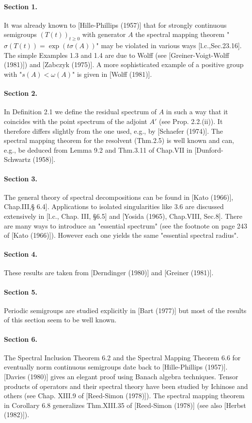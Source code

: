 \paragraph{Section 1.} It was already known to [Hille-Phillips (1957)] that for strongly continuous semigroups $(T(t))_{t\geq 0}$ with generator $A$ the spectral mapping theorem "$\sigma(T(t)) = \exp(t\sigma(A))$" may be violated in various ways [l.c.,Sec.23.16].
The simple Examples 1.3 and 1.4 are due to Wolff (see [Greiner-Voigt-Wolff (1981)]) and [Zabczyk (1975)].
A more sophisticated example of a positive group with "$s(A) < \omega(A)$" is given in [Wolff (1981)].

\paragraph{Section 2.} In Definition 2.1 we define the residual spectrum of $A$ in such a way that it coincides with the point spectrum of the adjoint $A'$ (see Prop. 2.2.(ii)).
It therefore differs slightly from the one used, e.g., by [Schaefer (1974)].
The spectral mapping theorem for the resolvent (Thm.2.5) is well known and can, e.g., be deduced from Lemma 9.2 and Thm.3.11 of Chap.VII in [Dunford-Schwartz (1958)].

\paragraph{Section 3.} The general theory of spectral decompositions can be found in [Kato (1966)], Chap.III,§ 6.4].
Applications to isolated singularities like 3.6 are discussed extensively in [l.c., Chap. III, §6.5] and [Yosida (1965), Chap.VIII, Sec.8].
There are many ways to introduce an "essential spectrum" (see the footnote on page 243 of [Kato (1966)]).
However each one yields the same "essential spectral radius".

\paragraph{Section 4.} These results are taken from [Derndinger (1980)] and [Greiner (1981)].

\paragraph{Section 5.} Periodic semigroups are studied explicitly in [Bart (1977)] but most of the results of this section seem to be well known.

\paragraph{Section 6.} The Spectral Inclusion Theorem 6.2 and the Spectral Mapping Theorem 6.6 for eventually norm continuous semigroups date back to [Hille-Phillips (1957)].
[Davies (1980)] gives an elegant proof using Banach algebra techniques.
Tensor products of operators and their spectral theory have been studied by Ichinose and others (see Chap. XIII.9 of [Reed-Simon (1978)]).
The spectral mapping theorem in Corollary 6.8 generalizes Thm.XIII.35 of [Reed-Simon (1978)] (see also [Herbst (1982)]).

